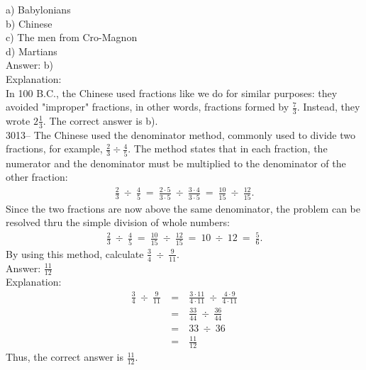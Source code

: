 \documentclass[letterpaper, 12pt]{article}
\begin{document}
a) Babylonians\\
b) Chinese\\
c) The men from Cro-Magnon\\
d) Martians\\

Answer: b)\\

Explanation:\\
In 100 B.C., the Chinese used fractions like we do for similar purposes: they avoided "improper" fractions, in other words, fractions formed by $\frac{7}{3}$. Instead, they wrote $2 \frac{1}{3}$. The correct answer is b).\\



3013-- The Chinese used the denominator method, commonly used to divide two fractions, for example, $\frac{2}{3} \div \frac{4}{5}$. The method states that in each fraction, the numerator and the denominator must be multiplied to the denominator of the other fraction:\\
\begin{eqnarray*}
\frac{2}{3} \ \div \ \frac{4}{5} \ = \ \frac{2\cdot5}{3\cdot5} \ \div \ \frac{3\cdot4}{3\cdot5} \ = \ \frac{10}{15} \ \div \ \frac{12}{15}.
\end{eqnarray*}
Since the two fractions are now above the same denominator, the problem can be resolved thru the simple division of whole numbers:
\begin{eqnarray*}
\frac{2}{3} \ \div \ \frac{4}{5} \ = \ \frac{10}{15} \ \div \ \frac{12}{15} \ = \ 10 \ \div \ 12 \ = \ \frac{5}{6}.
\end{eqnarray*}
By using this method, calculate $\frac{3}{4} \ \div \ \frac{9}{11}$.\\

Answer: $\frac{11}{12}$\\

Explanation:\\
\begin{eqnarray*}
\frac{3}{4} \ \div \ \frac{9}{11} \ &=& \ \frac{3\cdot11}{4\cdot11} \ \div \ \frac{4\cdot9}{4\cdot11}\\[2mm]
&=& \ \frac{33}{44} \ \div \ \frac{36}{44}\\[2mm]
&=& \ 33 \ \div \ 36\\[2mm]
&=& \ \frac{11}{12}
\end{eqnarray*}
Thus, the correct answer is $\frac{11}{12}$.\\
\end{document}
